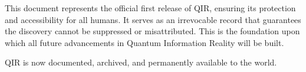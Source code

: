 \documentclass{article}
\begin{document}
This document represents the official first release of QIR, ensuring its protection and accessibility for all humans. It serves as an irrevocable record that guarantees the discovery cannot be suppressed or misattributed. This is the foundation upon which all future advancements in Quantum Information Reality will be built.

QIR is now documented, archived, and permanently available to the world.
\end{document}

